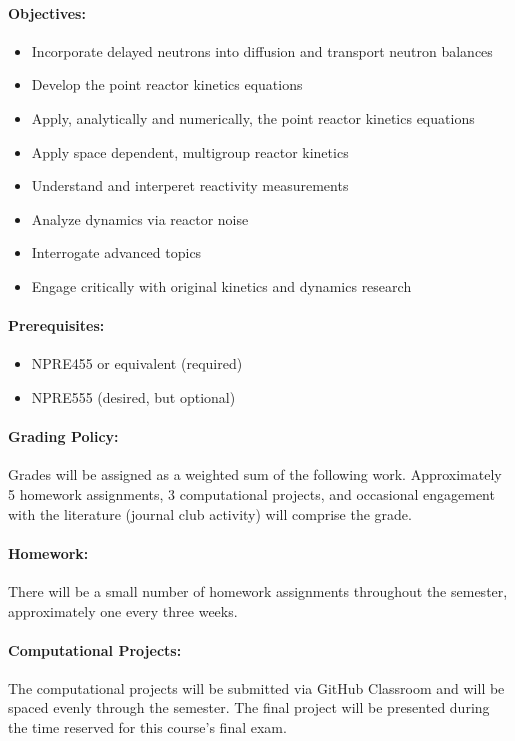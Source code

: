 \documentclass[11pt]{article}
\begin{document}
\paragraph{Objectives:}
\begin{itemize}
\item Incorporate delayed neutrons into diffusion and transport neutron balances
\item Develop the point reactor kinetics equations
\item Apply, analytically and numerically, the point reactor kinetics equations
\item Apply space dependent, multigroup reactor kinetics
\item Understand and interperet reactivity measurements
\item Analyze dynamics via reactor noise
\item Interrogate advanced topics 
\item Engage critically with original kinetics and dynamics research
\end{itemize}

\paragraph{Prerequisites:}
\begin{itemize}
        \item NPRE455 or equivalent (required) 
        \item NPRE555 (desired, but optional)
\end{itemize}

\paragraph{Grading Policy:} Grades will be assigned as a weighted sum of the
following work. Approximately 5 homework assignments, 3 computational projects, 
and occasional engagement with the literature (journal club activity) will comprise the 
grade.

\paragraph{Homework:} There will be a small number of homework assignments 
throughout the semester, approximately one every three weeks.

\paragraph{Computational Projects:} The computational projects will be 
submitted via GitHub Classroom and will be spaced evenly through the semester. 
The final project will be presented during the time reserved for this course's 
final exam.
\end{document}
